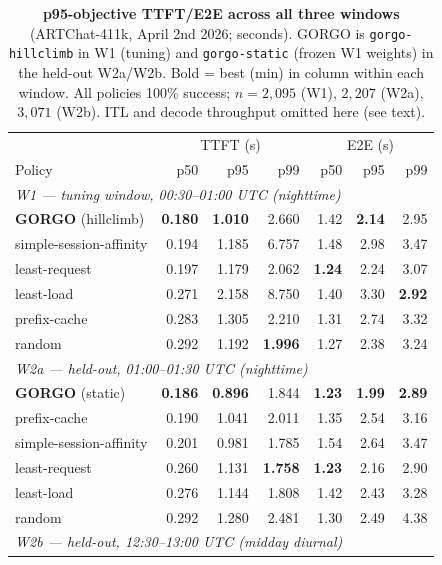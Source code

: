 \begin{table}[t]
\centering
\small
\caption{\textbf{p95-objective TTFT/E2E across all three windows} (ARTChat-411k,
  April 2nd 2026; seconds). GORGO is \texttt{gorgo-hillclimb} in W1 (tuning) and
  \texttt{gorgo-static} (frozen W1 weights) in the held-out W2a/W2b. Bold = best
  (min) in column within each window. All policies 100\% success; $n{=}2{,}095$
  (W1), $2{,}207$ (W2a), $3{,}071$ (W2b). ITL and decode throughput omitted here
  (see text).}
\label{tab:p95_all}
\begin{tabular}{lrrr|rrr}
\toprule
 & \multicolumn{3}{c|}{TTFT (s)} & \multicolumn{3}{c}{E2E (s)} \\
Policy & p50 & p95 & p99 & p50 & p95 & p99 \\
\midrule
\multicolumn{7}{l}{\textit{W1 --- tuning window, 00:30--01:00 UTC (nighttime)}} \\
\textbf{GORGO} (hillclimb) & \textbf{0.180} & \textbf{1.010} & 2.660 & 1.42 & \textbf{2.14} & 2.95 \\
simple-session-affinity    & 0.194 & 1.185 & 6.757 & 1.48 & 2.98 & 3.47 \\
least-request              & 0.197 & 1.179 & 2.062 & \textbf{1.24} & 2.24 & 3.07 \\
least-load                 & 0.271 & 2.158 & 8.750 & 1.40 & 3.30 & \textbf{2.92} \\
prefix-cache               & 0.283 & 1.305 & 2.210 & 1.31 & 2.74 & 3.32 \\
random                     & 0.292 & 1.192 & \textbf{1.996} & 1.27 & 2.38 & 3.24 \\
\midrule
\multicolumn{7}{l}{\textit{W2a --- held-out, 01:00--01:30 UTC (nighttime)}} \\
\textbf{GORGO} (static)    & \textbf{0.186} & \textbf{0.896} & 1.844 & \textbf{1.23} & \textbf{1.99} & \textbf{2.89} \\
prefix-cache               & 0.190 & 1.041 & 2.011 & 1.35 & 2.54 & 3.16 \\
simple-session-affinity    & 0.201 & 0.981 & 1.785 & 1.54 & 2.64 & 3.47 \\
least-request              & 0.260 & 1.131 & \textbf{1.758} & \textbf{1.23} & 2.16 & 2.90 \\
least-load                 & 0.276 & 1.144 & 1.808 & 1.42 & 2.43 & 3.28 \\
random                     & 0.292 & 1.280 & 2.481 & 1.30 & 2.49 & 4.38 \\
\midrule
\multicolumn{7}{l}{\textit{W2b --- held-out, 12:30--13:00 UTC (midday diurnal)}} \\

\end{tabular}
\end{table}
